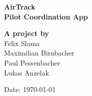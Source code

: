 \begin{titlepage}
    \thispagestyle{title}
    \setlength{\headheight}{63pt}
    \begin{center}
        \vspace*{4cm}
    
        \LARGE
        \textbf{AirTrack \\ Pilot Coordination App}
        
        \vspace{6cm}
    
        \normalsize
            \textbf{A project by} \\
            Felix Slama \\
            Maximilian Birnbacher \\
            Paul Pessenbacher \\
            Lukas Anzelak
    \end{center}
    
    \vfill
    
    \noindent
    
    \vspace{5mm}
    
    \noindent
    Date: \today
    \vspace{2cm}
\end{titlepage}